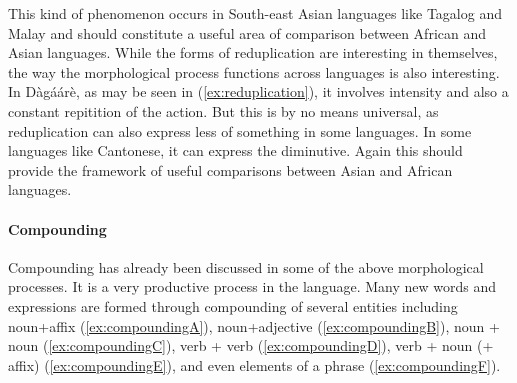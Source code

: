 This kind of phenomenon occurs in South-east Asian languages like Tagalog and Malay and should constitute a useful area of comparison between African and Asian languages. While the forms of reduplication are interesting in themselves, the way the
morphological process functions across languages is also interesting. In Dàgáárè, as may be
seen in (\ref{ex:reduplication}), it involves intensity and also a constant repitition of the action. But this is by no
means universal, as reduplication can also express less of something in some languages. In
some languages like Cantonese, it can express the diminutive. Again this should provide the
framework of useful comparisons between Asian and African languages.

\paragraph{Compounding}
Compounding has already been discussed in some of the above morphological
processes. It is a very productive process in the language. Many new words and expressions are formed through compounding of several entities including noun+affix (\ref{ex:compoundingA}),
noun+adjective (\ref{ex:compoundingB}), noun + noun (\ref{ex:compoundingC}), verb + verb (\ref{ex:compoundingD}), verb + noun (+ affix) (\ref{ex:compoundingE}), and
even elements of a phrase (\ref{ex:compoundingF}).

